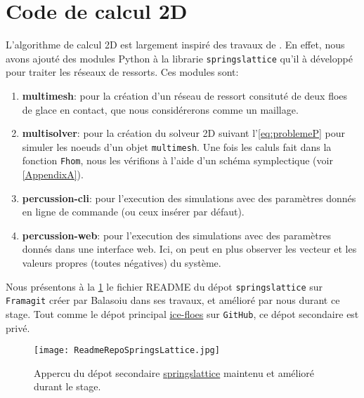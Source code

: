 
\section{Code de calcul 2D}


L'algorithme de calcul 2D est largement inspiré des travaux de \citeauthor{balasoiu2020halthesis}. En effet, nous avons ajouté des modules Python à la librarie \texttt{springslattice} qu'il à développé pour traiter les réseaux de ressorts. Ces modules sont:
\begin{enumerate}
    \item \textbf{multimesh}: pour la création d'un réseau de ressort consituté de deux floes de glace en contact, que nous considérerons comme un maillage.
    \item \textbf{multisolver}: pour la création du solveur 2D suivant l'\cref{eq:problemeP} pour simuler les noeuds d'un objet \texttt{multimesh}. Une fois les caluls fait dans la fonction \texttt{Fhom}, nous les vérifions à l'aide d'un schéma symplectique (voir \cref{AppendixA}).
    \item \textbf{percussion-cli}: pour l'execution des simulations avec des paramètres donnés en ligne de commande (ou ceux insérer par défaut).
    \item \textbf{percussion-web}: pour l'execution des simulations avec des paramètres donnés dans une interface web. Ici, on peut en plus observer les vecteur et les valeurs propres (toutes négatives) du système.
\end{enumerate}

Nous présentons à la \cref{fig:readme2d} le fichier README du dépot \texttt{springslattice} sur \texttt{Framagit} créer par Balasoiu dans ses travaux, et amélioré par nous durant ce stage. Tout comme le dépot principal \href{https://github.com/desmond-rn/ice-floes}{ice-floes} sur \texttt{GitHub}, ce dépot secondaire est privé.
\begin{figure}[!h]
    \centering
    \texttt{[image: ReadmeRepoSpringsLattice.jpg]}
    \caption{Appercu du dépot secondaire \href{https://framagit.org/RaK/SimuRessorts/-/tree/master}{springslattice} maintenu et amélioré durant le stage.}
    \label{fig:readme2d}
\end{figure}




